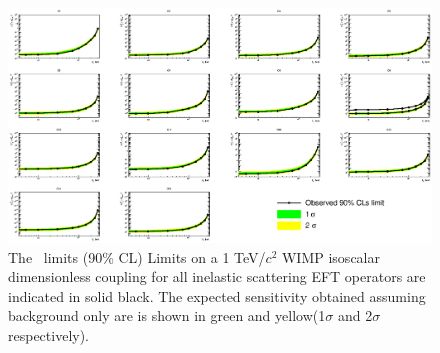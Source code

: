 \begin{figure}
\begin{minipage}{1.\linewidth}
\centerline{\includegraphics[width=1.\linewidth]{Figures/FinalInelastic.eps}}
\end{minipage}
\caption{The \Xehund\ limits (90\% CL) Limits on a 1 TeV/$c^2$ WIMP isoscalar dimensionless coupling for all inelastic scattering EFT operators are indicated in solid black. The expected sensitivity obtained assuming background only are is shown in green and yellow(1$\sigma$ and 2$\sigma$ respectively). }
\label{fig:elasticLimit}
\end{figure}

\FloatBarrier

